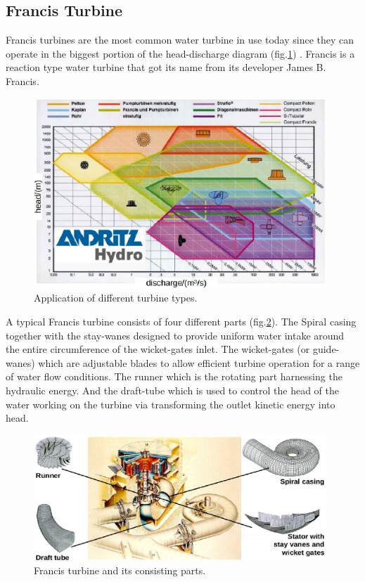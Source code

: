 \subsection{Francis Turbine}
Francis turbines are the most common water turbine in use today since they can operate in the biggest portion of the head-discharge diagram (fig.\ref{range}) \cite{papanto}. Francis is a reaction type water turbine that got its name from its developer James B. Francis. 

\begin{figure}[h!]
\centering
\includegraphics[width=110mm]{range.eps} 
\caption{Application of different turbine types.}
\label{range}
\end{figure}

A typical Francis turbine consists of four different parts (fig.\ref{francis1}). The Spiral casing  together with the stay-wanes designed to provide uniform water intake around the entire circumference of the wicket-gates inlet. The wicket-gates (or guide-wanes) which are adjustable blades to allow efficient turbine operation for a range of water flow conditions. The runner which is the rotating part harnessing the hydraulic energy. And the draft-tube which is used to control the head of the water working on the turbine via transforming the outlet kinetic energy into head.

\begin{figure}[h!]
\centering
\includegraphics[width=110mm]{francis1.eps} 
\caption{Francis turbine and its consisting parts.}
\label{francis1}
\end{figure}

